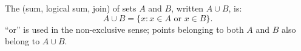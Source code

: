 The  (sum, logical sum, join) of sets $A$ and $B$, written $A \cup B$, is:
$$
A \cup B = \{x : x \in A \text{ or } x \in B\}.
$$
``or'' is used in the non-exclusive sense; points belonging to both $A$ and $B$ also belong to $A \cup B$.
